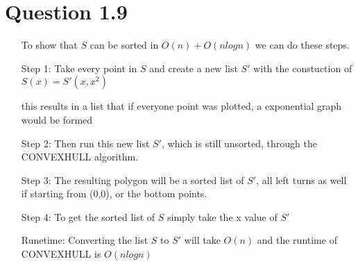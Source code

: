 \documentclass[12pt]{article}
\begin{document}
\section*{Question 1.9}
\begin{itemize}
    \item[] To show that $S$ can be sorted in $O(n)+O(nlogn)$ we can do these steps.
    \item[Step 1:] Take every point in $S$ and create a new list $S'$ with the constuction of $S(x) = S'(x,x^2)$
    \item[] this results in a list that if everyone point was plotted, a exponential graph would be formed
    \item[Step 2:] Then run this new list $S'$, which is still unsorted, through the CONVEXHULL algorithm.
    \item[Step 3:] The resulting polygon will be a sorted list of $S'$, all left turns as well if starting from (0,0), or the bottom points.
    \item[Step 4:] To get the sorted list of $S$ simply take the x value of $S'$
    \item[Runetime:] Converting the list $S$ to $S'$ will take $O(n)$ and the runtime of CONVEXHULL is $O(nlogn)$    
\end{itemize}
\end{document}
